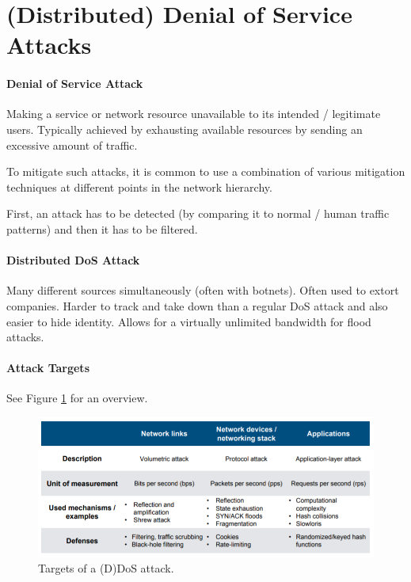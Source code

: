 \section{(Distributed) Denial of Service Attacks}

\paragraph{Denial of Service Attack}
Making a service or network resource unavailable to its intended / legitimate users. Typically achieved by exhausting available resources by sending an excessive amount of traffic.

To mitigate such attacks, it is common to use a combination of various mitigation techniques at different points in the network hierarchy.

First, an attack has to be detected (by comparing it to normal / human traffic patterns) and then it has to be filtered.

\paragraph{Distributed DoS Attack}
Many different sources simultaneously (often with botnets). Often used to extort companies. Harder to track and take down than a regular DoS attack and also easier to hide identity. Allows for a virtually unlimited bandwidth for flood attacks.

\paragraph{Attack Targets}
See Figure \ref{fig:ddos_target} for an overview.

\begin{figure}[h]
	\centering
	\includegraphics[scale=0.7]{images/910-targets.PNG}
	\caption{Targets of a (D)DoS attack.}
	\label{fig:ddos_target}
\end{figure}

